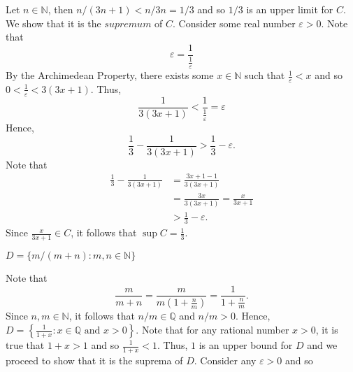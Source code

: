 \documentclass[12pt]{article}
\newcommand{\N}{\mathbb{N}}
\newcommand{\Q}{\mathbb{Q}}
\newenvironment{problem}[2][Problem]{\begin{trivlist}
		\item[\hskip \labelsep {\bfseries #1}\hskip \labelsep {\bfseries #2.}]}{\end{trivlist}}
\newenvironment{solution}[2][Solution]{\begin{trivlist}
		\item[\hskip \labelsep {\bfseries #1}\hskip \labelsep {\bfseries #2.}]}{\end{trivlist}}
\begin{document}
\begin{problem}{1.3.8}
\begin{enumerate}[label=(\alph*)]
\begin{solution}{(c)}
			Let $n\in \N$, then $n/(3n+1) < n/3n = 1/3$ and so $1/3$ is an upper limit for $C$. We show that it is the $supremum$ of $C$. Consider some real number $\varepsilon > 0$. Note that 
			\begin{equation*}
				\varepsilon = \frac{1}{\frac{1}{\varepsilon}}
			\end{equation*}
			By the Archimedean Property, there exists some $x\in \N$ such that $\frac{1}{\varepsilon} < x$ and so $0<\frac{1}{\varepsilon} < 3(3x+1)$. Thus,
		\begin{equation*}
		 \frac{1}{3(3x+1)} < \frac{1}{\frac{1}{\varepsilon}}=\varepsilon
		\end{equation*}
		Hence, 
		\begin{equation*}
			\frac{1}{3}-\frac{1}{3(3x+1)} > \frac{1}{3}-\varepsilon.
		\end{equation*}
	Note that
		\begin{align*}
			\frac{1}{3}-\frac{1}{3(3x+1)} &= \frac{3x+1-1}{3(3x+1)}\\
			&= \frac{3x}{3(3x+1)} = \frac{x}{3x+1}\\
			&> \frac{1}{3}-\varepsilon.
		\end{align*}
	Since $\frac{x}{3x+1} \in C$, it follows that $\sup C = \frac{1}{3}$. 
				\end{solution} 
		\item $D=\{m/(m+n):m,n\in \N\}$
		\begin{solution}{d}
			Note that 
			\begin{equation*}
				\frac{m}{m+n} = \frac{m}{m(1+\frac{n}{m})} = \frac{1}{1+\frac{n}{m}}.
			\end{equation*}
		Since $n,m\in \N$, it follows that $n/m\in \Q$ and $n/m > 0$. Hence, $D=\left\{\frac{1}{1+x}:x\in \Q \text{ and } x>0\right\}$. Note that for any rational number $x>0$, it is true that $1+x>1$ and so $\frac{1}{1+x} < 1$. Thus, $1$ is an upper bound for $D$ and we proceed to show that it is the suprema of $D$. Consider any $\varepsilon>0$ and so
		

\end{solution}
\end{enumerate}
\end{problem}
\end{document}
